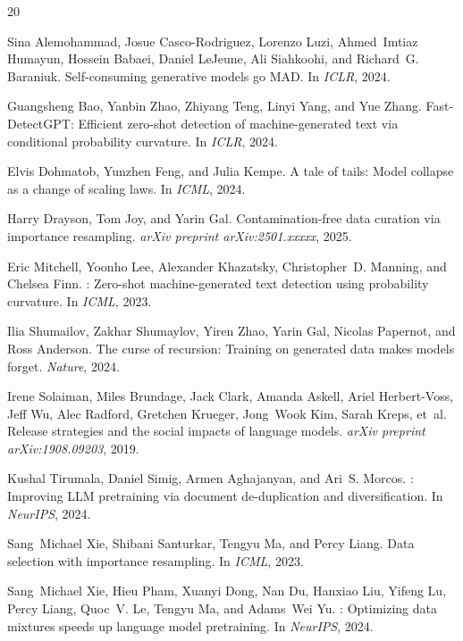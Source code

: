 \documentclass[11pt]{article}
\begin{document}

\begin{thebibliography}{20}

Sina Alemohammad, Josue Casco-Rodriguez, Lorenzo Luzi, Ahmed~Imtiaz Humayun, Hossein Babaei, Daniel LeJeune, Ali Siahkoohi, and Richard~G. Baraniuk.
\newblock Self-consuming generative models go {MAD}.
\newblock In \emph{ICLR}, 2024.

Guangsheng Bao, Yanbin Zhao, Zhiyang Teng, Linyi Yang, and Yue Zhang.
\newblock Fast-{DetectGPT}: Efficient zero-shot detection of machine-generated text via conditional probability curvature.
\newblock In \emph{ICLR}, 2024.

Elvis Dohmatob, Yunzhen Feng, and Julia Kempe.
\newblock A tale of tails: Model collapse as a change of scaling laws.
\newblock In \emph{ICML}, 2024.

Harry Drayson, Tom Joy, and Yarin Gal.
\newblock Contamination-free data curation via importance resampling.
\newblock \emph{arXiv preprint arXiv:2501.xxxxx}, 2025.

Eric Mitchell, Yoonho Lee, Alexander Khazatsky, Christopher~D. Manning, and Chelsea Finn.
: Zero-shot machine-generated text detection using probability curvature.
\newblock In \emph{ICML}, 2023.

Ilia Shumailov, Zakhar Shumaylov, Yiren Zhao, Yarin Gal, Nicolas Papernot, and Ross Anderson.
\newblock The curse of recursion: Training on generated data makes models forget.
\newblock \emph{Nature}, 2024.

Irene Solaiman, Miles Brundage, Jack Clark, Amanda Askell, Ariel Herbert-Voss, Jeff Wu, Alec Radford, Gretchen Krueger, Jong~Wook Kim, Sarah Kreps, et~al.
\newblock Release strategies and the social impacts of language models.
\newblock \emph{arXiv preprint arXiv:1908.09203}, 2019.

Kushal Tirumala, Daniel Simig, Armen Aghajanyan, and Ari~S. Morcos.
: Improving {LLM} pretraining via document de-duplication and diversification.
\newblock In \emph{NeurIPS}, 2024.

Sang~Michael Xie, Shibani Santurkar, Tengyu Ma, and Percy Liang.
\newblock Data selection with importance resampling.
\newblock In \emph{ICML}, 2023.

Sang~Michael Xie, Hieu Pham, Xuanyi Dong, Nan Du, Hanxiao Liu, Yifeng Lu, Percy Liang, Quoc~V. Le, Tengyu Ma, and Adams~Wei Yu.
: Optimizing data mixtures speeds up language model pretraining.
\newblock In \emph{NeurIPS}, 2024.

\end{thebibliography}
\end{document}
